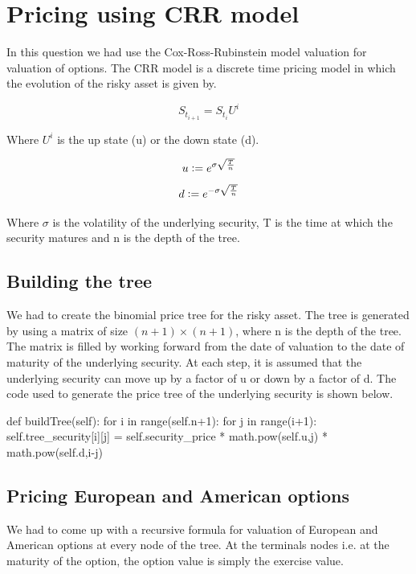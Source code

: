 \documentclass[12pt]{report}
\newcommand{\defeq}{\vcentcolon=}
\begin{document}
\chapter*{Pricing using CRR model}

In this question we had use the Cox-Ross-Rubinstein model valuation for valuation of options. The CRR model is a discrete time pricing model in which the evolution of the risky asset is given by.

\begin{equation*}
	S_{t_{i+1}} = S_{t_{i}}U^{i}
\end{equation*}	

Where $U^i$ is the up state (u) or the down state (d).

\begin{equation*}
	u \defeq e^{\sigma \sqrt{\frac{T}{n}} }
\end{equation*}
\begin{equation*}
	d \defeq e^{-\sigma \sqrt{\frac{T}{n}} }
\end{equation*}

Where $\sigma$ is the volatility of the underlying security, T is the time at which the security matures and n is the depth of the tree. 

\section*{Building the tree}
We had to create the binomial price tree for the risky asset. The tree is generated by using a matrix of size $(n+1) \times (n+1)$, where n is the depth of the tree. The matrix is filled by working forward from the date of valuation to the date of maturity of the underlying security. At each step, it is assumed that the underlying security can move up by a factor of u or down by a factor of d. The code used to generate the price tree of the underlying security is shown below.
\
\begin{tiny}
\begin{python}
def buildTree(self):
 for i in range(self.n+1):
   for j in range(i+1):
     self.tree_security[i][j] = self.security_price * math.pow(self.u,j) * math.pow(self.d,i-j)
	\end{python}	
\end{tiny}

\section*{Pricing European and American options}
We had to come up with a recursive formula for valuation of European and American options at every node of the tree. At the terminals nodes i.e. at the maturity of the option, the option value is simply the exercise value. 
\end{document}
